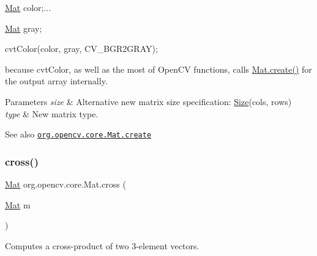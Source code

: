 {\ttfamily \mbox{\hyperlink{classorg_1_1opencv_1_1core_1_1_mat}{Mat}} color;...}

{\ttfamily }

{\ttfamily }

{\ttfamily \mbox{\hyperlink{classorg_1_1opencv_1_1core_1_1_mat}{Mat}} gray;}

{\ttfamily }

{\ttfamily }

{\ttfamily cvt\+Color(color, gray, C\+V\+\_\+\+B\+G\+R2\+G\+R\+A\+Y);}

{\ttfamily }

{\ttfamily }

{\ttfamily because {\ttfamily cvt\+Color}, as well as the most of Open\+CV functions, calls {\ttfamily \mbox{\hyperlink{classorg_1_1opencv_1_1core_1_1_mat_a539b0a3690afb6b43047b50cbb787fee}{Mat.\+create()}}} for the output array internally. }


\begin{DoxyParams}{Parameters}
{\em size} & Alternative new matrix size specification\+: {\ttfamily \mbox{\hyperlink{classorg_1_1opencv_1_1core_1_1_size}{Size}}(cols, rows)} \\
\hline
{\em type} & New matrix type.\\
\hline
\end{DoxyParams}
\begin{DoxySeeAlso}{See also}
\href{http://docs.opencv.org/modules/core/doc/basic_structures.html#mat-create}{\tt org.\+opencv.\+core.\+Mat.\+create} 
\end{DoxySeeAlso}
\mbox{\label{classorg_1_1opencv_1_1core_1_1_mat_a830b2d8626fe668db82180adf69e6145}} 
\subsubsection{\texorpdfstring{cross()}{cross()}}
{\footnotesize\ttfamily \mbox{\hyperlink{classorg_1_1opencv_1_1core_1_1_mat}{Mat}} org.\+opencv.\+core.\+Mat.\+cross (\begin{DoxyParamCaption}\item[{\mbox{\hyperlink{classorg_1_1opencv_1_1core_1_1_mat}{Mat}}}]{m }\end{DoxyParamCaption})}

Computes a cross-\/product of two 3-\/element vectors.

